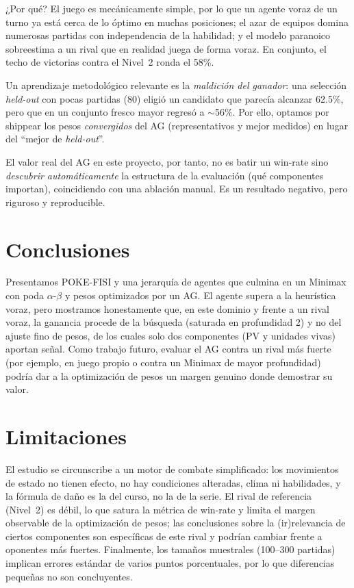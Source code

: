\documentclass[11pt]{article}
\begin{document}
¿Por qué? El juego es mecánicamente simple, por lo que un agente voraz de un turno
ya está cerca de lo óptimo en muchas posiciones; el azar de equipos domina
numerosas partidas con independencia de la habilidad; y el modelo paranoico
sobreestima a un rival que en realidad juega de forma voraz. En conjunto, el techo
de victorias contra el Nivel~2 ronda el 58\%.

Un aprendizaje metodológico relevante es la \emph{maldición del ganador}: una
selección \emph{held-out} con pocas partidas (80) eligió un candidato que parecía
alcanzar 62.5\%, pero que en un conjunto fresco mayor regresó a $\sim$56\%. Por
ello, optamos por shippear los pesos \emph{convergidos} del AG (representativos y
mejor medidos) en lugar del ``mejor de \emph{held-out}''.

El valor real del AG en este proyecto, por tanto, no es batir un win-rate sino
\emph{descubrir automáticamente} la estructura de la evaluación (qué componentes
importan), coincidiendo con una ablación manual. Es un resultado negativo, pero
riguroso y reproducible.

\section{Conclusiones}
\label{sec:conclusiones}

Presentamos POKE-FISI y una jerarquía de agentes que culmina en un Minimax con
poda $\alpha$-$\beta$ y pesos optimizados por un AG. El agente supera a la
heurística voraz, pero mostramos honestamente que, en este dominio y frente a un
rival voraz, la ganancia procede de la búsqueda (saturada en profundidad 2) y no
del ajuste fino de pesos, de los cuales solo dos componentes (PV y unidades vivas)
aportan señal. Como trabajo futuro, evaluar el AG contra un rival más fuerte
(por ejemplo, en juego propio o contra un Minimax de mayor profundidad) podría dar
a la optimización de pesos un margen genuino donde demostrar su valor.

\section*{Limitaciones}

El estudio se circunscribe a un motor de combate simplificado: los movimientos de
estado no tienen efecto, no hay condiciones alteradas, clima ni habilidades, y la
fórmula de daño es la del curso, no la de la serie. El rival de referencia
(Nivel~2) es débil, lo que satura la métrica de win-rate y limita el margen
observable de la optimización de pesos; las conclusiones sobre la (ir)relevancia
de ciertos componentes son específicas de este rival y podrían cambiar frente a
oponentes más fuertes. Finalmente, los tamaños muestrales (100--300 partidas)
implican errores estándar de varios puntos porcentuales, por lo que diferencias
pequeñas no son concluyentes.
\end{document}

